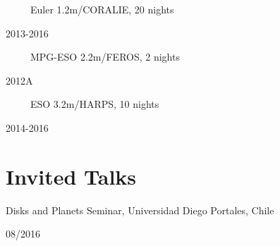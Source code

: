 \documentclass[11pt, a4paper]{article} %
\begin{document}
\begin{minipage}[t]{0.7\textwidth}
\ \ \ \ \ Euler 1.2m/CORALIE, 20 nights
\end{minipage}
\begin{minipage}[t]{0.3\textwidth}
\hfill 2013-2016
\end{minipage}

\begin{minipage}[t]{0.7\textwidth}
\ \ \ \ \ MPG-ESO 2.2m/FEROS, 2 nights
\end{minipage}
\begin{minipage}[t]{0.3\textwidth}
\hfill 2012A
\end{minipage}

\begin{minipage}[t]{0.7\textwidth}
\ \ \ \ \ ESO 3.2m/HARPS, 10 nights
\end{minipage}
\begin{minipage}[t]{0.3\textwidth}
\hfill 2014-2016
\end{minipage}
\section*{Invited Talks}

\begin{minipage}[t]{0.7\textwidth}
\begin{flushleft}%
  \setlength{\leftskip}{0.2cm}%
Disks and Planets Seminar, Universidad Diego Portales, Chile
\end{flushleft}
\end{minipage}
\begin{minipage}[t]{0.3\textwidth}
\hfill 08/2016
\end{minipage}
\end{document}
